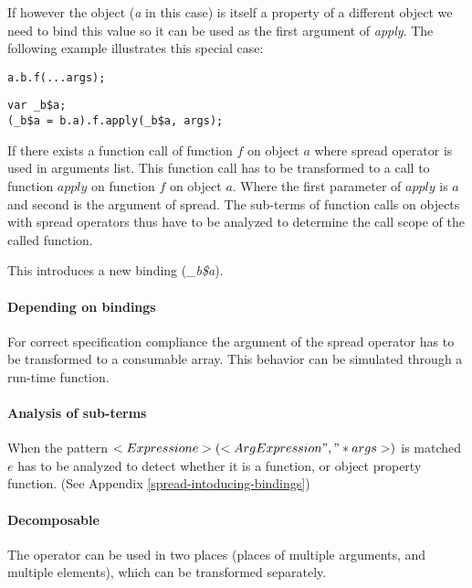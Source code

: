 If however the object (\textit{a} in this case) is itself a property of a different object we need to bind this value so it can be used as the first argument of \textit{apply}. The following example illustrates this special case:

\begin{minipage}{0.45\textwidth}
\begin{lstlisting}
a.b.f(...args);
\end{lstlisting}
\end{minipage}
\hfill
\begin{minipage}{0.45\textwidth}
\begin{lstlisting}
var _b$a;
(_b$a = b.a).f.apply(_b$a, args);
\end{lstlisting}
\end{minipage}

If there exists a function call of function $f$ on object $a$ where spread operator is used in arguments list. This function call has to be transformed to a call to function $apply$ on function $f$ on object $a$. Where the first parameter of $apply$ is $a$ and second is the argument of spread. The sub-terms of function calls on objects with spread operators thus have to be analyzed to determine the call scope of the called function.

This introduces a new binding (\textit{\_b\$a}).

\paragraph{Depending on bindings}
For correct specification compliance the argument of the spread operator has to be transformed to a consumable array. This behavior can be simulated through a run-time function.

\paragraph{Analysis of sub-terms} \label{spread-analysis-sub-terms}
When the pattern $<Expression e>(<{ArgExpression ","}* args>)$ is matched $e$ has to be analyzed to detect whether it is a function, or object property function. (See Appendix \ref{spread-intoducing-bindings})

\paragraph{Decomposable}
The operator can be used in two places (places of multiple arguments, and multiple elements), which can be transformed separately.

